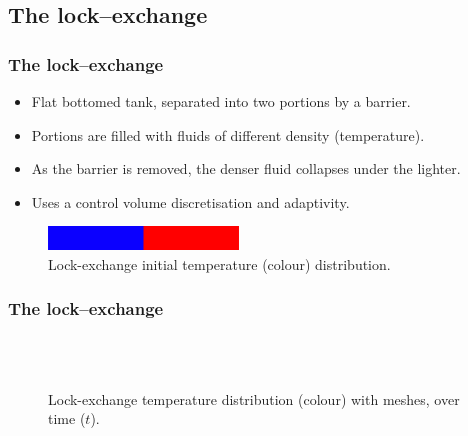 \subsection{The lock--exchange}

\begin{frame}
    \frametitle{The lock--exchange}
\begin{itemize}
\item Flat bottomed tank, separated into two portions by a barrier.
\item Portions are filled with fluids of different density (temperature).
\item As the barrier is removed, the denser fluid collapses under the lighter.
\item Uses a control volume discretisation and adaptivity.
\end{itemize}

\begin{figure}
\centering
\includegraphics[width=0.45\textwidth]{./lock_exchange/le_basic_0_T}
\caption{Lock-exchange initial temperature (colour) distribution.}
\end{figure}

\end{frame}
%
\begin{frame}
    \frametitle{The lock--exchange}
\begin{figure}[ht]
  \centering
   \\
   \\
  \caption{Lock-exchange temperature distribution (colour) with meshes, over time ($t$).}
\end{figure}
\end{frame}
